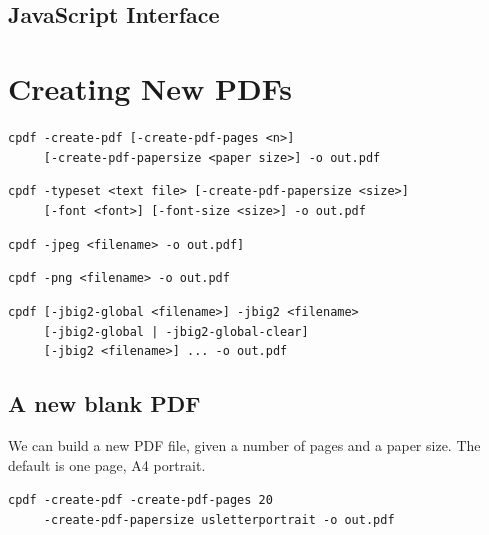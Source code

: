 \documentclass{book}
\begin{document}
\begin{jscpdflib}
\clearpage
\section*{JavaScript Interface}
\begin{small}\tt

\end{small}
\end{jscpdflib}

\clearpage\pagestyle{empty}
\chapter{Creating New PDFs}\label{chap:17}\pagestyle{fancy}

  {\small\begin{framed}
  \noindent\verb!cpdf -create-pdf [-create-pdf-pages <n>]!\\
  \noindent\verb!     [-create-pdf-papersize <paper size>] -o out.pdf!


  \vspace{1.5mm}
  \noindent\verb!cpdf -typeset <text file> [-create-pdf-papersize <size>]!\\
  \noindent\verb!     [-font <font>] [-font-size <size>] -o out.pdf!

  \vspace{1.5mm}
  \noindent\verb!cpdf -jpeg <filename> -o out.pdf]!

  \vspace{1.5mm}
  \noindent\verb!cpdf -png <filename> -o out.pdf!

  \vspace{1.5mm}
  \noindent\verb!cpdf [-jbig2-global <filename>] -jbig2 <filename>!\\
  \noindent\verb!     [-jbig2-global | -jbig2-global-clear]!\\
  \noindent\verb!     [-jbig2 <filename>] ... -o out.pdf!
  \end{framed}}

\section{A new blank PDF}

We can build a new PDF file, given a number of pages and a paper size. The default is one page, A4 portrait.

\begin{framed}
 \noindent\small\verb?cpdf -create-pdf -create-pdf-pages 20?\\
 \noindent\small\verb?     -create-pdf-papersize usletterportrait -o out.pdf?
\end{framed}
\end{document}
